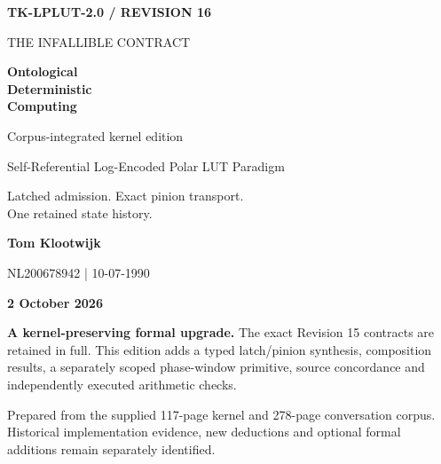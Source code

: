 \documentclass[11pt,a4paper]{article}
\theoremstyle{lpstyle}
\begin{document}
\begin{titlepage}
\thispagestyle{empty}
{\sffamily\bfseries\color{teal}\large TK-LPLUT-2.0 / REVISION 16}\par
\vspace{16mm}
{\sffamily\color{muted}\Large THE INFALLIBLE CONTRACT}\par
\vspace{5mm}
{\sffamily\bfseries\color{navy}\fontsize{34}{39}\selectfont Ontological\\Deterministic\\Computing\par}
\vspace{9mm}
{\sffamily\color{teal}\fontsize{19}{24}\selectfont Corpus-integrated kernel edition\par}
\vspace{3mm}
{\color{muted}Self-Referential Log-Encoded Polar LUT Paradigm}\par
\vspace{6mm}
{\large Latched admission. Exact pinion transport.\\One retained state history.}\par
\vspace{10mm}
\par
\vspace{9mm}
{\sffamily\bfseries\Large Tom Klootwijk}\par
{\color{muted}NL200678942 | 10-07-1990}\par
\vspace{6mm}
{\sffamily\bfseries 2 October 2026}\par
\vfill
\begin{principle}
\textbf{A kernel-preserving formal upgrade.} The exact Revision 15 contracts are retained in full. This edition adds a typed latch/pinion synthesis, composition results, a separately scoped phase-window primitive, source concordance and independently executed arithmetic checks.
\end{principle}
{\small\color{muted}Prepared from the supplied 117-page kernel and 278-page conversation corpus. Historical implementation evidence, new deductions and optional formal additions remain separately identified.}
\end{titlepage}
\end{document}
